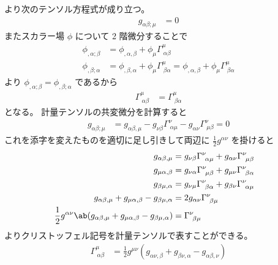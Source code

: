 \documentclass[uplatex,dvipdfmx,a4paper,11pt]{jlreq}
\theoremstyle{definition}
\begin{document}
より次のテンソル方程式が成り立つ。
\begin{align}
  g_{\alpha\beta;\mu} & = 0
\end{align}
またスカラー場 $\phi$ について 2 階微分することで
\begin{align}
  \phi_{,\alpha;\beta} & = \phi_{,\alpha,\beta} + \phi_\mu\Gamma^\mu_{\ \alpha\beta}                                                             \\
  \phi_{,\beta;\alpha} & = \phi_{,\beta,\alpha} + \phi_\mu\Gamma^\mu_{\ \beta\alpha} = \phi_{,\alpha,\beta} + \phi_\mu\Gamma^\mu_{\ \beta\alpha}
\end{align}
より $\phi_{,\alpha;\beta} = \phi_{,\beta;\alpha}$ であるから
\begin{align}
  \Gamma^\mu_{\ \alpha\beta} & = \Gamma^\mu_{\ \beta\alpha}
\end{align}
となる。
計量テンソルの共変微分を計算すると
\begin{align}
  g_{\alpha\beta;\mu} & = g_{\alpha\beta,\mu} - g_{\nu\beta}\Gamma^\nu_{\ \alpha\mu} - g_{\alpha\nu}\Gamma^\nu_{\ \mu\beta} = 0
\end{align}
これを添字を変えたものを適切に足し引きして両辺に $\frac{1}{2}g^{\alpha\nu}$ を掛けると
\begin{align}
  g_{\alpha\beta,\mu}                                                                          & = g_{\nu\beta}\Gamma^\nu_{\ \alpha\mu} + g_{\alpha\nu}\Gamma^\nu_{\ \mu\beta} & \\
  g_{\mu\alpha,\beta}                                                                          & = g_{\nu\alpha}\Gamma^\nu_{\ \mu\beta} + g_{\mu\nu}\Gamma^\nu_{\ \beta\alpha}   \\
  g_{\beta\mu,\alpha}                                                                          & = g_{\nu\mu}\Gamma^\nu_{\ \beta\alpha} + g_{\beta\nu}\Gamma^\nu_{\ \alpha\mu}   \\
  g_{\alpha\beta,\mu} + g_{\mu\alpha,\beta} - g_{\beta\mu,\alpha}                              & = 2g_{\alpha\nu}\Gamma^\nu_{\ \beta\mu}                                         \\
  \frac{1}{2}g^{\alpha\nu}\ab(g_{\alpha\beta,\mu} + g_{\mu\alpha,\beta} - g_{\beta\mu,\alpha}) & = \Gamma^\nu_{\ \beta\mu}
\end{align}
よりクリストッフェル記号を計量テンソルで表すことができる。
\begin{align}
  \Gamma^\mu_{\ \alpha\beta} & = \frac{1}{2}g^{\mu\nu}(g_{\alpha\nu,\beta} + g_{\beta\nu,\alpha} - g_{\alpha\beta,\nu})
\end{align}
\end{document}
